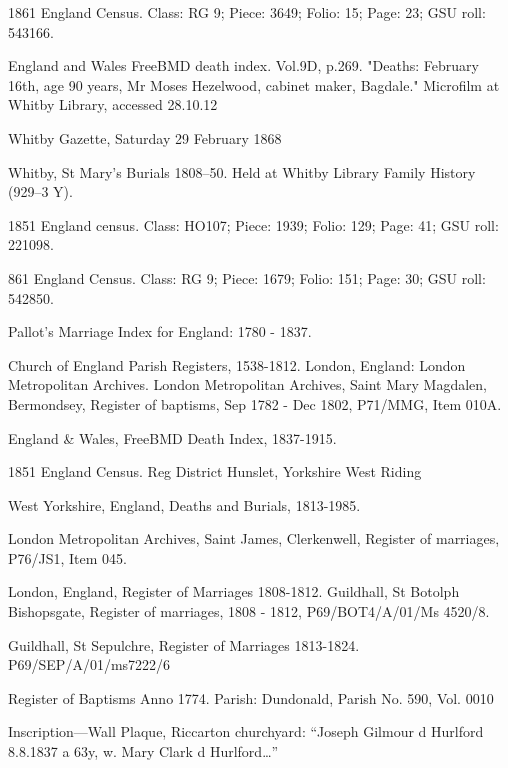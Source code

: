 \begin{thebibliography}{99}
	1861 England Census. Class: RG 9; Piece: 3649; Folio: 15; Page: 23; GSU roll: 543166.
	
	England and Wales FreeBMD death index. Vol.9D, p.269. 
	"Deaths: February 16th, age 90 years, Mr Moses Hezelwood, cabinet maker, Bagdale." Microfilm at Whitby 			Library, accessed 28.10.12
	
	Whitby Gazette, Saturday 29 February 1868
	
	Whitby, St Mary's Burials 1808--50. Held at Whitby Library Family History (929--3 Y).

	 1851 England census. Class: HO107; Piece: 1939; Folio: 129; Page: 41; GSU roll: 221098.
	 
	861 England Census. Class: RG 9; Piece: 1679; Folio: 151; Page: 30; GSU roll: 542850.
	
	 Pallot's Marriage Index for England: 1780 - 1837.
	 
	Church of England Parish Registers, 1538-1812. London, England: London Metropolitan Archives.
	London Metropolitan Archives, Saint Mary Magdalen, Bermondsey, Register of baptisms, Sep 1782 - Dec 1802, 		P71/MMG, Item 010A.
	
	England \& Wales, FreeBMD Death Index, 1837-1915. 
	
	1851 England Census. Reg District Hunslet, Yorkshire West Riding
	
	West Yorkshire, England, Deaths and Burials, 1813-1985. 
	
	London Metropolitan Archives, Saint James, Clerkenwell, Register of marriages, P76/JS1, Item 045. 
	
	 London, England, Register of Marriages 1808-1812.
	 Guildhall, St Botolph Bishopsgate, Register of marriages, 1808 - 1812, P69/BOT4/A/01/Ms 4520/8.
	 
	 Guildhall, St Sepulchre, Register of Marriages 1813-1824. P69/SEP/A/01/ms7222/6
	 
	 Register of Baptisms Anno 1774. Parish: Dundonald, Parish No. 590, Vol. 0010

	Inscription---Wall Plaque, Riccarton churchyard:
	``Joseph Gilmour d Hurlford 8.8.1837 a 63y, w. Mary Clark d Hurlford\dots''


\end{thebibliography}
